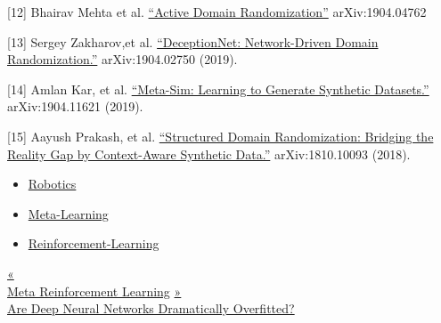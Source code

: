 {[}12{]} Bhairav Mehta et al. \href{https://arxiv.org/abs/1904.04762}{``Active Domain Randomization''} arXiv:1904.04762

{[}13{]} Sergey Zakharov,et al. \href{https://arxiv.org/abs/1904.02750}{``DeceptionNet: Network-Driven Domain Randomization.''} arXiv:1904.02750 (2019).

{[}14{]} Amlan Kar, et al. \href{https://arxiv.org/abs/1904.11621}{``Meta-Sim: Learning to Generate Synthetic Datasets.''} arXiv:1904.11621 (2019).

{[}15{]} Aayush Prakash, et al. \href{https://arxiv.org/abs/1810.10093}{``Structured Domain Randomization: Bridging the Reality Gap by Context-Aware Synthetic Data.''} arXiv:1810.10093 (2018).

\begin{itemize}
\tightlist
\item
  \href{https://lilianweng.github.io/tags/robotics/}{Robotics}
\item
  \href{https://lilianweng.github.io/tags/meta-learning/}{Meta-Learning}
\item
  \href{https://lilianweng.github.io/tags/reinforcement-learning/}{Reinforcement-Learning}
\end{itemize}

\href{https://lilianweng.github.io/posts/2019-06-23-meta-rl/}{{« }\\
{Meta Reinforcement Learning}} \href{https://lilianweng.github.io/posts/2019-03-14-overfit/}{{ »}\\
{Are Deep Neural Networks Dramatically Overfitted?}}


